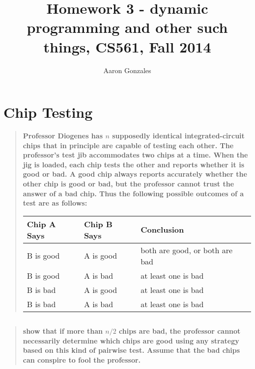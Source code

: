 \documentclass[titlepage]{article}\usepackage[]{graphicx}\usepackage[]{color}
\begin{document}
\title{Homework 3 - dynamic programming and other such things, CS561, Fall 2014}
\author{Aaron Gonzales}
\maketitle


\section{Chip Testing }

\begin{quote}
\textbf{Professor Diogenes has $n$ supposedly identical integrated-circuit chips that
in principle are capable of testing each other. The professor's test jib
accommodates two chips at a time. When the jig is loaded, each chip tests the
other and reports whether it is good or bad. A good chip always reports
accurately whether the other chip is good or bad, but the professor cannot
trust the answer of a bad chip. Thus the following possible outcomes of a test
are as follows:}

\begin{table}[h]
\centering
  \begin{tabular}{lll}
	\hline
	\multicolumn{1}{|l|}{Chip A Says} & \multicolumn{1}{l|}{Chip B Says} & \multicolumn{1}{l|}{Conclusion} \\ \hline
	B is good                         & A is good                        & both are good, or both are bad  \\ \hline
	B is good                         & A is bad                         & at least one is bad             \\ \hline
	B is bad                          & A is good                        & at least one is bad             \\ \hline
	B is bad                          & A is bad                         & at least one is bad             \\ \hline
	\end{tabular}
  \end{table}

\end{quote}


\subsection{}
  \begin{quote}
\textbf{show that if more than $n/2$ chips are bad, the professor cannot
	necessarily determine which chips are good using any strategy based on this
	kind of pairwise test. Assume that the bad chips can conspire to fool the
	professor. }
  \end{quote}
\end{document}
